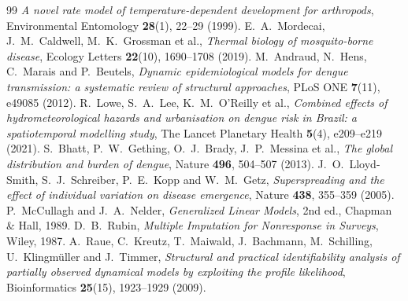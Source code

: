 \documentclass[11pt,a4paper]{article}
\begin{document}
\begin{thebibliography}{99}
\emph{A novel rate model of temperature-dependent development for arthropods},
Environmental Entomology \textbf{28}(1), 22--29 (1999).
 E.~A.~Mordecai, J.~M.~Caldwell, M.~K.~Grossman et al.,
\emph{Thermal biology of mosquito-borne disease}, Ecology Letters \textbf{22}(10),
1690--1708 (2019).
 M.~Andraud, N.~Hens, C.~Marais and P.~Beutels, \emph{Dynamic
epidemiological models for dengue transmission: a systematic review of structural
approaches}, PLoS ONE \textbf{7}(11), e49085 (2012).
 R.~Lowe, S.~A.~Lee, K.~M.~O'Reilly et al., \emph{Combined
effects of hydrometeorological hazards and urbanisation on dengue risk in Brazil:
a spatiotemporal modelling study}, The Lancet Planetary Health \textbf{5}(4),
e209--e219 (2021).
 S.~Bhatt, P.~W.~Gething, O.~J.~Brady, J.~P.~Messina et al.,
\emph{The global distribution and burden of dengue}, Nature \textbf{496},
504--507 (2013).
 J.~O.~Lloyd-Smith, S.~J.~Schreiber, P.~E.~Kopp and
W.~M.~Getz, \emph{Superspreading and the effect of individual variation on
disease emergence}, Nature \textbf{438}, 355--359 (2005).
 P.~McCullagh and J.~A.~Nelder, \emph{Generalized Linear
Models}, 2nd ed., Chapman \& Hall, 1989.
 D.~B.~Rubin, \emph{Multiple Imputation for Nonresponse in
Surveys}, Wiley, 1987.
 A.~Raue, C.~Kreutz, T.~Maiwald, J.~Bachmann, M.~Schilling,
U.~Klingmüller and J.~Timmer, \emph{Structural and practical identifiability
analysis of partially observed dynamical models by exploiting the profile
likelihood}, Bioinformatics \textbf{25}(15), 1923--1929 (2009).
\end{thebibliography}
\end{document}
